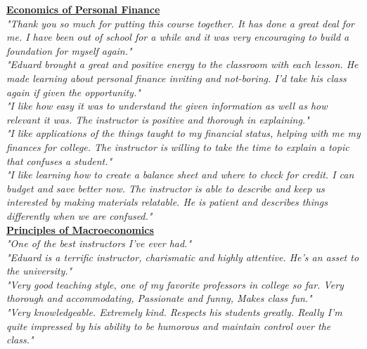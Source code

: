 \documentclass[a4paper,11pt]{article}
\begin{document}

\ul{\textbf{Economics of Personal Finance}} \\

\textit{"Thank you so much for putting this course together. It has done a great deal for me. I have been out of school for a while and it was very encouraging to build a foundation for myself again."} \\

\textit{"Eduard brought a great and positive energy to the classroom with each lesson. He made learning about personal finance inviting and not-boring. I'd take his class again if given the opportunity."} \\

\textit{"I like how easy it was to understand the given information as well as how relevant it was. The instructor is positive and thorough in explaining."} \\

\textit{"I like applications of the things taught to my financial status, helping with me my finances for college. The instructor is willing to take the time to explain a topic that confuses a student."} \\


\textit{"I like learning how to create a balance sheet and where to check for credit. I can budget and save better now. The instructor is able to describe and keep us interested by making materials relatable. He is patient and describes things differently when we are confused."} \\




\ul{\textbf{Principles of Macroeconomics}} \\

\textit{"One of the best instructors I've ever had."} \\

\textit{"Eduard is a terrific instructor, charismatic and highly attentive. He's an asset to the university."} \\

\textit{"Very good teaching style, one of my favorite professors in college so far. Very thorough and accommodating, Passionate and funny, Makes class fun."}  \\

\textit{"Very knowledgeable. Extremely kind. Respects his students greatly. Really I'm quite impressed by his ability to be humorous and maintain control over the class."}  \\
\end{document}
